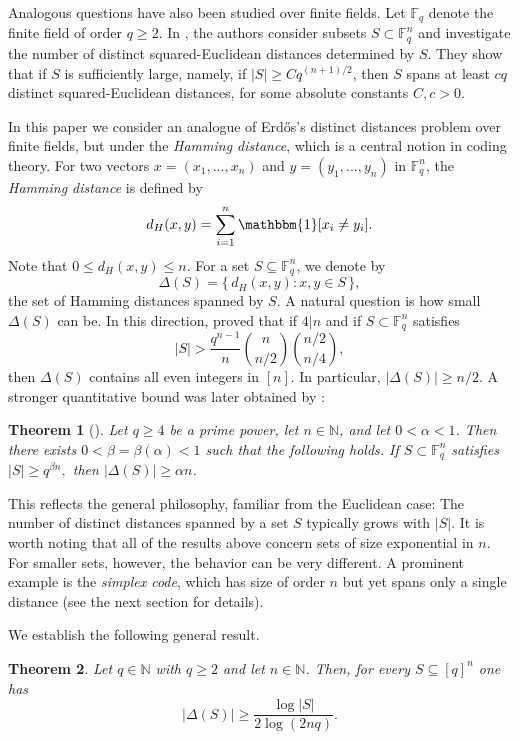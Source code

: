 \documentclass{article}
\newtheorem{thm}{Theorem}%
\theoremstyle{definition}
\begin{document}
Analogous questions have also been studied over finite fields. Let $\mathbb{F}_q$ denote the finite field of order $q \ge 2$. In \cite{iosevich2007erdos}, the authors consider subsets $S \subset \mathbb{F}_q^n$ and investigate the number of distinct squared-Euclidean distances determined by $S$. They show that if $S$ is sufficiently large, namely, if $|S|\ge Cq^{(n+1)/2}$, then $S$ spans at least $cq$ distinct squared-Euclidean distances, for some absolute constants $C,c>0$.


In this paper we consider an analogue of Erd\H{o}s's distinct distances problem over finite fields, but under the {\it Hamming distance}, which is a central notion in coding theory. 
For two vectors $x = (x_1,...,x_n)$ and $y = (y_1,...,y_n)$ in $\mathbb{F}_q^n$, the {\it Hamming distance} is defined by 
$$d_H(x,y) = \sum_{i=1}^n \mathbbm{1}[x_i \neq y_i].$$  Note that $0\le d_H(x,y)\le n$. For a set $S\subseteq \mathbb{F}_q^n$, we denote by 
\[
\Delta(S)=\{\, d_H(x,y): x,y\in S \,\},
\]
the set of Hamming distances spanned by $S$. 
A natural question is how small $\Delta(S)$ can be. In this direction, 
\cite{yazici2019hamming} proved that if $4|n$ and if $S\subset \mathbb{F}_q^n$ satisfies $$|S|>\frac{q^{n-1}}{n}\binom{n}{n/2}\binom{n/2}{n/4},$$ then $\Delta(S)$ contains all even integers  in $[n]$. In particular, $|\Delta(S)|\ge n/2$.
A stronger quantitative bound was later obtained by \cite{xu2020erdos}:
\begin{thm}[\cite{xu2020erdos}]
    Let $q\ge 4$ be a prime power, let $n\in \mathbb{N}$, and let $0<\alpha<1$. Then there exists $0<\beta=\beta(\alpha)< 1$ such that the  following holds. If $S\subset \mathbb{F}_q^n$ satisfies
    $
|S|\ge q^{\beta n},$
then $|\Delta(S)|\ge \alpha n$.
\end{thm}
This reflects the general philosophy, familiar from the Euclidean case: 
The number of distinct distances spanned by a set $S$ typically grows with $|S|$.
It is worth noting that all of the results above concern sets of size exponential in $n$. For smaller sets, however, the behavior can be very different. A prominent example is the {\it simplex code}, which has size of order $n$ but yet spans only a single distance (see the next section for details).

We establish the following general result. %
\begin{thm}\label{thm:large_set_many_distances}
Let $q\in \mathbb{N}$ with  $q\geq 2$ and let $n \in \mathbb{N}$. Then, for every $S\subseteq [q]^n$ one has
$$
|\Delta(S)|\ge \frac{\log |S|}{2\log(2nq)}.
$$
\end{thm}
\end{document}

